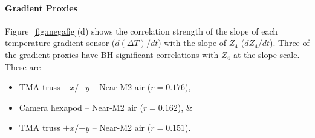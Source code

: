 \documentclass[SE,authoryear,toc]{lsstdoc}
\begin{document}
\begin{table}[htbp]
\centering
\caption{Pearson $r$ and autocorrelation-corrected $p$-values for individual
temperature sensors correlated with $Z_4^{(c)}$ (levels) and $dZ_4/dt$
(slope). Bolded values denote predictors surviving Benjamini--Hochberg
correction at $\alpha = 0.05$. Sorted by $|r|$ at levels scale.}
\label{tab:sensor_corr}
\end{table}

\paragraph{Gradient Proxies} Figure~\ref{fig:megafig}(d) shows the correlation strength of the slope of each temperature gradient sensor ($d(\Delta T)/dt$) with the slope of $Z_4$ ($dZ_4/dt$). Three of the gradient proxies have BH-significant correlations with $Z_4$ at the slope scale. These are 
\begin{itemize}
    \item TMA truss $-x/{-y}$ -- Near-M2 air ($r=0.176$),
    \item Camera hexapod -- Near-M2 air ($r=0.162$), \&
    \item TMA truss $+x/{+y}$ -- Near-M2 air ($r=0.151$).
\end{itemize}
\end{document}
